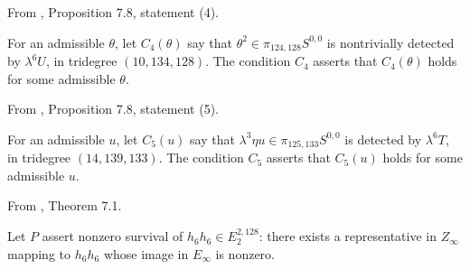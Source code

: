 \begin{definition}
\label{sem:Main:square-detection}
From \cite{LWX126}, Proposition 7.8, statement (4).\par
For an admissible $\theta$, let $C_4(\theta)$ say that $\theta^2\in\pi_{124,128}S^{0,0}$ is nontrivially detected by $\lambda^6 U$, in tridegree $(10,134,128)$. The condition $C_4$ asserts that $C_4(\theta)$ holds for some admissible $\theta$.
\end{definition}

\begin{definition}
\label{sem:Main:eta-detection}
From \cite{LWX126}, Proposition 7.8, statement (5).\par
For an admissible $u$, let $C_5(u)$ say that $\lambda^3\eta u\in\pi_{125,133}S^{0,0}$ is detected by $\lambda^6 T$, in tridegree $(14,139,133)$. The condition $C_5$ asserts that $C_5(u)$ holds for some admissible $u$.
\end{definition}

\begin{definition}
\label{sem:Main:nonzero-permanence}
From \cite{LWX126}, Theorem 7.1.\par
Let $P$ assert nonzero survival of $h_6h_6\in E_2^{2,128}$: there exists a representative in $Z_\infty$ mapping to $h_6h_6$ whose image in $E_\infty$ is nonzero.
\end{definition}

